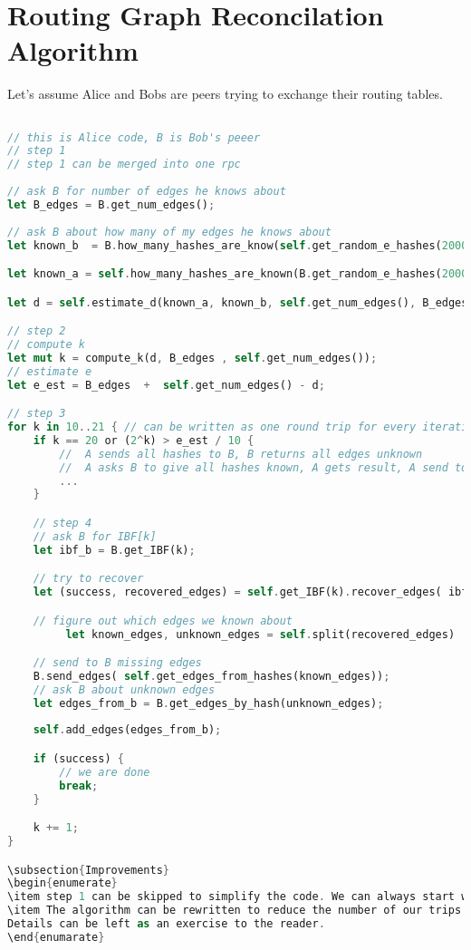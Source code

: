 \documentclass[11pt]{article}
\begin{document}
\section{Routing Graph Reconcilation Algorithm}
Let's assume Alice and Bobs are peers trying to exchange their routing tables.
\begin{lstlisting}[language=Rust]

// this is Alice code, B is Bob's peeer
// step 1
// step 1 can be merged into one rpc
         
// ask B for number of edges he knows about
let B_edges = B.get_num_edges();
         
// ask B about how many of my edges he knows about
let known_b  = B.how_many_hashes_are_know(self.get_random_e_hashes(2000));

let known_a = self.how_many_hashes_are_known(B.get_random_e_hashes(2000));

let d = self.estimate_d(known_a, known_b, self.get_num_edges(), B_edges);

// step 2
// compute k
let mut k = compute_k(d, B_edges , self.get_num_edges());
// estimate e
let e_est = B_edges  +  self.get_num_edges() - d;

// step 3
for k in 10..21 { // can be written as one round trip for every iteration
	if k == 20 or (2^k) > e_est / 10 {
		//  A sends all hashes to B, B returns all edges unknown
		//  A asks B to give all hashes known, A gets result, A send to B all edges it needs
		...
	}

	// step 4
	// ask B for IBF[k]
	let ibf_b = B.get_IBF(k);

	// try to recover
	let (success, recovered_edges) = self.get_IBF(k).recover_edges( ibf_b);

	// figure out which edges we known about
         let known_edges, unknown_edges = self.split(recovered_edges)

	// send to B missing edges
	B.send_edges( self.get_edges_from_hashes(known_edges));
	// ask B about unknown edges
	let edges_from_b = B.get_edges_by_hash(unknown_edges);
	
	self.add_edges(edges_from_b);

	if (success) {
		// we are done	
		break;
	}

	k += 1;
}

\subsection{Improvements}
\begin{enumerate}
\item step 1 can be skipped to simplify the code. We can always start with k = 10
\item The algorithm can be rewritten to reduce the number of our trips. Each iteration of loop can be made into a half of a round trip.
Details can be left as an exercise to the reader.
\end{enumarate}

\end{lstlisting}
\end{document}
